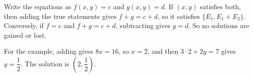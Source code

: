 Write the equations as $f(x,y)=c$ and $g(x,y)=d$. If $(x,y)$ satisfies both, then adding the true statements gives $f+g=c+d$, so it satisfies $\{E_1,E_1+E_2\}$. Conversely, if $f=c$ and $f+g=c+d$, subtracting gives $g=d$. So no solutions are gained or lost.

For the example, adding gives $8x=16$, so $x=2$, and then $3\cdot2+2y=7$ gives $y=\dfrac12$. The solution is $\boxed{\left(2,\dfrac12\right)}$.
